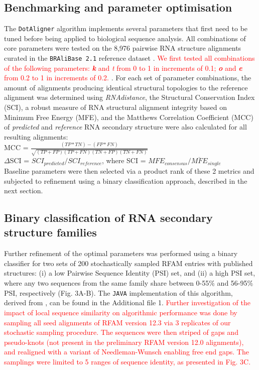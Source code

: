 \documentclass{bmcart}
\newcommand\dotaligner{\texttt{DotAligner}}
\newcommand\bralibase{\texttt{BRAliBase 2.1}}
\begin{document}
\subsection*{Benchmarking and parameter optimisation}

The \dotaligner{} algorithm implements several parameters that
first need to be tuned before being applied to biological sequence
analysis. All combinations of core parameters were tested on the 8,976
pairwise RNA structure alignments curated in the \bralibase{} reference dataset
\cite{wilm2006enhanced}. \textcolor{red}{We first tested all combinations of the following parameters: \textit{\textbf{k}} and \textit{\textit{t}} from 0 to 1 in increments of 0.1;  \textit{\textbf{o}} and \textbf{\textit{e}} from 0.2 to 1 in increments of 0.2. 
 }. For each set of parameter combinations, the amount of
alignments producing identical structural topologies to the reference alignment
was determined using \textit{RNAdistance}, the Structural Conservation Index
(SCI), a robust measure of RNA structural alignment integrity
\cite{gruber2008strategies} based on Minimum Free Energy (MFE), and the Matthews Correlation Coefficient (MCC) of \textit{predicted} and \textit{reference} RNA secondary structure
were also calculated for all resulting alignments: \\

MCC = $\frac{(TP * TN) - (FP * FN)}{ \sqrt{ (TP + FP)(TP + FN)(TN + FP)(TN + FN) }}$\\

$\Delta$SCI = $SCI_{predicted} / SCI_{reference}$, where SCI = $ MFE_{consensus}  / \overline{MFE}_{single}  $\\

Baseline parameters were then selected via a product rank of these 2 metrics 
and subjected to refinement using a binary classification approach, described in the next section. 

\subsection*{Binary classification of RNA secondary structure families}
Further refinement of the optimal parameters was performed using a binary classifier for two sets of 
200 stochastically sampled RFAM entries with published structures: 
(i) a low Pairwise Sequence Identity (PSI) set, and (ii) a high PSI set, 
where any two sequences from the same family share between 0-55\% and 56-95\% PSI, respectively (Fig. 3A-B). 
The \texttt{JAVA} implementation of this algorithm, derived from \cite{smith2013widespread}, can be found in the Additional file 1. \textcolor{red}{Further investigation of the impact of local sequence similarity on algorithmic 
performance was done by sampling all seed alignments of RFAM version 12.3 via 3 replicates of
our stochastic sampling procedure. The sequences were then striped of gaps and pseudo-knots 
(not present in the preliminary RFAM version 12.0 alignments), and realigned with a variant of 
Needleman-Wunsch enabling free end gaps. The samplings were limited to 5 ranges of sequence identity, as
presented in Fig. 3C. }\\
\end{document}
